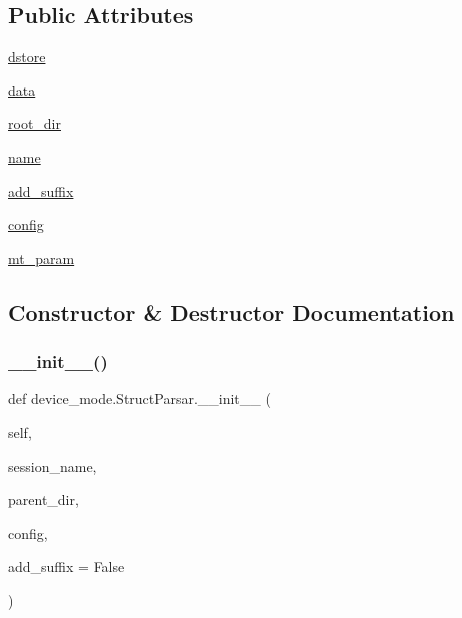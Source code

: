 \subsection*{Public Attributes}
\begin{DoxyCompactItemize}
\item 
\hyperlink{classdevice__mode_1_1StructParsar_a6f57d24a6006d990240bfcabfc06782f}{dstore}
\item 
\hyperlink{classdevice__mode_1_1StructParsar_acd42c1ec4385bc3acaa7a265df70d4be}{data}
\item 
\hyperlink{classdevice__mode_1_1StructParsar_a1e7769eb90fbb3821659d58b5607d17f}{root\+\_\+dir}
\item 
\hyperlink{classdevice__mode_1_1StructParsar_a937fe4559444433d8cff05910c16a4b6}{name}
\item 
\hyperlink{classdevice__mode_1_1StructParsar_a0f1adb7dde59a293a12a4889e9b3880b}{add\+\_\+suffix}
\item 
\hyperlink{classdevice__mode_1_1StructParsar_a54cc58295d8352d412afb79f32f1ac06}{config}
\item 
\hyperlink{classdevice__mode_1_1StructParsar_ad41412b88f13b25fc0dffcf5c62b4259}{mt\+\_\+param}
\end{DoxyCompactItemize}


\subsection{Constructor \& Destructor Documentation}
\mbox{\label{classdevice__mode_1_1StructParsar_a3fd85c5d99b5bfc1e359d9457cc07df1}} 
\subsubsection{\texorpdfstring{\+\_\+\+\_\+init\+\_\+\+\_\+()}{\_\_init\_\_()}}
{\footnotesize\ttfamily def device\+\_\+mode.\+Struct\+Parsar.\+\_\+\+\_\+init\+\_\+\+\_\+ (\begin{DoxyParamCaption}\item[{}]{self,  }\item[{}]{session\+\_\+name,  }\item[{}]{parent\+\_\+dir,  }\item[{}]{config,  }\item[{}]{add\+\_\+suffix = {\ttfamily False} }\end{DoxyParamCaption})}



